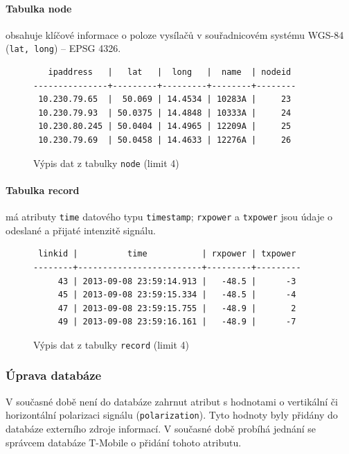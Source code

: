 \documentclass[a4paper,12pt,oneside]{report}
\begin{document}
\paragraph*{Tabulka node} obsahuje klíčové informace o poloze vysílačů
v souřadnicovém systému WGS-84 (\texttt{lat, long}) -- EPSG 4326.

\begin{figure}[h!]
\centering
\footnotesize
\begin{BVerbatim}
   ipaddress   |   lat   |  long   |  name  | nodeid 
---------------+---------+---------+--------+--------
 10.230.79.65  |  50.069 | 14.4534 | 10283A |     23
 10.230.79.93  | 50.0375 | 14.4848 | 10333A |     24
 10.230.80.245 | 50.0404 | 14.4965 | 12209A |     25
 10.230.79.69  | 50.0458 | 14.4633 | 12276A |     26
\end{BVerbatim}
\caption{Výpis dat z tabulky  \texttt{node} (limit 4)}
\end{figure}

\paragraph*{Tabulka record} má atributy \texttt{time} datového typu
\texttt{timestamp}; \texttt{rxpower} a \texttt{txpower} jsou údaje o
odeslané a přijaté intenzitě signálu.

\begin{figure}[h!]
\centering
\footnotesize
\begin{BVerbatim}
 linkid |          time           | rxpower | txpower 
--------+-------------------------+---------+---------
     43 | 2013-09-08 23:59:14.913 |   -48.5 |      -3
     45 | 2013-09-08 23:59:15.334 |   -48.5 |      -4
     47 | 2013-09-08 23:59:15.755 |   -48.9 |       2
     49 | 2013-09-08 23:59:16.161 |   -48.9 |      -7
\end{BVerbatim}
\caption{Výpis dat z tabulky \texttt{record} (limit 4) }
\end{figure}




\subsubsection*{Úprava databáze}
\label{subsubsec:upravadatabaze}  
V současné době není do databáze zahrnut atribut s hodnotami o vertikální či
horizontální pola\-rizaci signálu (\texttt{polarization}). Tyto hodnoty byly přidány do databáze externího zdroje informací. 
V současné době probíhá jednání se správcem databáze
T-Mobile o přidání tohoto atributu.
 
\end{document}
